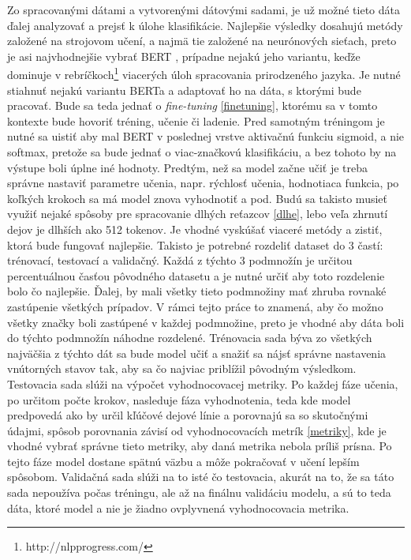 Zo spracovanými dátami a vytvorenými dátovými sadami, je už možné tieto dáta ďalej analyzovať a prejsť k úlohe klasifikácie. Najlepšie výsledky dosahujú metódy založené na strojovom učení, a najmä tie založené na neurónových sieťach, preto je asi najvhodnejšie vybrať BERT \cite{Devlin:2018}, prípadne nejakú jeho variantu, keďže dominuje v rebríčkoch\footnote{http://nlpprogress.com/} viacerých úloh spracovania prirodzeného jazyka. Je nutné stiahnuť nejakú variantu BERTa a adaptovať ho na dáta, s ktorými bude pracovať. Bude sa teda jednať o \textit{fine-tuning} \ref{finetuning}, ktorému sa v tomto kontexte bude hovoriť tréning, učenie či ladenie. Pred samotným tréningom je nutné sa uistiť aby mal BERT v poslednej vrstve aktivačnú funkciu sigmoid, a nie softmax, pretože sa bude jednať o viac-značkovú klasifikáciu, a bez tohoto by na výstupe boli úplne iné hodnoty. Predtým, než sa model začne učiť je treba správne nastaviť parametre učenia, napr. rýchlosť učenia, hodnotiaca funkcia, po koľkých krokoch sa má model znova vyhodnotiť a pod. Budú sa takisto musieť využiť nejaké spôsoby pre spracovanie dlhých reťazcov \ref{dlhe}, lebo veľa zhrnutí dejov je dlhších ako 512 tokenov. Je vhodné vyskúšať viaceré metódy a zistiť, ktorá bude fungovať najlepšie. Takisto je potrebné rozdeliť dataset do 3 častí: trénovací, testovací a validačný. Každá z týchto 3 podmnožín je určitou percentuálnou časťou pôvodného datasetu a je nutné určiť aby toto rozdelenie bolo čo najlepšie. Ďalej, by mali všetky tieto podmnožiny mať zhruba rovnaké zastúpenie všetkých prípadov. V rámci tejto práce to znamená, aby čo možno všetky značky boli zastúpené v každej podmnožine, preto je vhodné aby dáta boli do týchto podmnožín náhodne rozdelené. Trénovacia sada býva zo všetkých najväčšia z týchto dát sa bude model učiť a snažiť sa nájsť správne nastavenia vnútorných stavov tak, aby sa čo najviac priblížil pôvodným výsledkom. Testovacia sada slúži na výpočet vyhodnocovacej metriky. Po každej fáze učenia, po určitom počte krokov, nasleduje fáza vyhodnotenia, teda kde model predpovedá ako by určil kľúčové dejové línie a porovnajú sa so skutočnými údajmi, spôsob porovnania závisí od vyhodnocovacích metrík \ref{metriky}, kde je vhodné vybrať správne tieto metriky, aby daná metrika nebola príliš prísna. Po tejto fáze model dostane spätnú väzbu a môže pokračovať v učení lepším spôsobom. Validačná sada slúži na to isté čo testovacia, akurát na to, že sa táto sada nepoužíva počas tréningu, ale až na finálnu validáciu modelu, a sú to teda dáta, ktoré model  a nie je žiadno ovplyvnená vyhodnocovacia metrika. 

